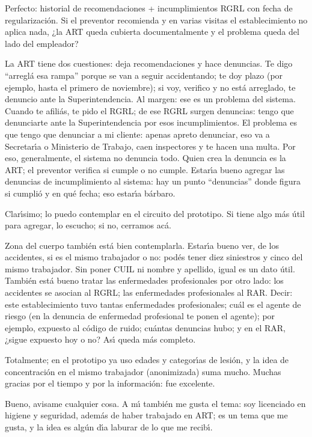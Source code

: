 \begin{description}[style=nextline, leftmargin=0cm, labelsep=0.35cm]
\item[\textbf{Entrevistador:}]
Perfecto: historial de recomendaciones + incumplimientos RGRL con fecha de regularizaci\'on.
Si el preventor recomienda y en varias visitas el establecimiento no aplica nada, ¿la ART queda cubierta documentalmente y el problema queda del lado del empleador?

\item[\textbf{Entrevistado:}]
La ART tiene dos cuestiones: deja recomendaciones y hace denuncias.
Te digo ``arregl\'a esa rampa'' porque se van a seguir accidentando; te doy plazo (por ejemplo, hasta el primero de noviembre); si voy, verifico y no est\'a arreglado, te denuncio ante la Superintendencia.
Al margen: ese es un problema del sistema.
Cuando te afili\'as, te pido el RGRL; de ese RGRL surgen denuncias: tengo que denunciarte ante la Superintendencia por esos incumplimientos.
El problema es que tengo que denunciar a mi cliente: apenas apreto denunciar, eso va a Secretar\'{\i}a o Ministerio de Trabajo, caen inspectores y te hacen una multa.
Por eso, generalmente, el sistema no denuncia todo.
Quien crea la denuncia es la ART; el preventor verifica si cumple o no cumple.
Estar\'{\i}a bueno agregar las denuncias de incumplimiento al sistema: hay un punto ``denuncias'' donde figura si cumpli\'o y en qu\'e fecha; eso estar\'{\i}a b\'arbaro.

\item[\textbf{Entrevistador:}]
Clar\'{\i}simo; lo puedo contemplar en el circuito del prototipo.
Si tiene algo m\'as \'util para agregar, lo escucho; si no, cerramos ac\'a.

\item[\textbf{Entrevistado:}]
Zona del cuerpo tambi\'en est\'a bien contemplarla.
Estar\'{\i}a bueno ver, de los accidentes, si es el mismo trabajador o no: pod\'es tener diez siniestros y cinco del mismo trabajador.
Sin poner CUIL ni nombre y apellido, igual es un dato \'util.
Tambi\'en est\'a bueno tratar las enfermedades profesionales por otro lado: los accidentes se asocian al RGRL; las enfermedades profesionales al RAR.
Decir: este establecimiento tuvo tantas enfermedades profesionales; cu\'al es el agente de riesgo (en la denuncia de enfermedad profesional te ponen el agente); por ejemplo, expuesto al c\'odigo de ruido; cu\'antas denuncias hubo; y en el RAR, ¿sigue expuesto hoy o no?
As\'{\i} queda m\'as completo.

\item[\textbf{Entrevistador:}]
Totalmente; en el prototipo ya uso edades y categor\'{\i}as de lesi\'on, y la idea de concentraci\'on en el mismo trabajador (anonimizada) suma mucho.
Muchas gracias por el tiempo y por la informaci\'on: fue excelente.

\item[\textbf{Entrevistado:}]
Bueno, avisame cualquier cosa.
A m\'{\i} tambi\'en me gusta el tema: soy licenciado en higiene y seguridad, adem\'as de haber trabajado en ART; es un tema que me gusta, y la idea es alg\'un d\'{\i}a laburar de lo que me recib\'{\i}.

\end{description}

